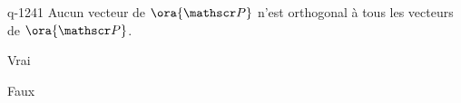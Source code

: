 \begin{truefalse}{q-1241}
Aucun vecteur de $\ora {\mathscr P}$ n'est orthogonal à tous les vecteurs de $\ora {\mathscr P}$.
\item Vrai
\item* Faux
\end{truefalse}

